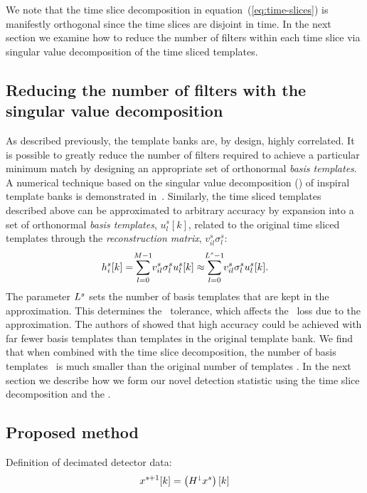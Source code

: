 We note that
the time slice decomposition in equation~(\ref{eq:time-slices}) is manifestly
orthogonal since the time slices are disjoint in time.  In the next
section we examine how to reduce the number of filters within each time slice via
singular value decomposition of the time sliced templates.

\subsection{Reducing the number of filters with the singular value
decomposition}

As described previously, the template banks are, by design, highly correlated.
It is possible to greatly reduce the number of filters required to achieve a
particular minimum match by designing an appropriate set of orthonormal {\em
basis templates}.  A numerical technique based on the
singular value decomposition (\SVD) of inspiral template banks is demonstrated
in~\cite{Cannon:2010p10398}.  Similarly, the time sliced templates described above
can be approximated to arbitrary accuracy by expansion into a set of orthonormal
\emph{basis templates}, $u_l^s[k]$, related to the original time sliced templates
through the \emph{reconstruction matrix}, $v_{il}^s\sigma_l^s$:
%
\begin{equation}
h_i^s[k] = \sum_{\mathclap{l=0}}^{\mathclap{M-1}} v_{il}^s \sigma_l^s u_l^s[k] \approx \sum_{\mathclap{l=0}}^{\mathclap{L^s-1}} v_{il}^s \sigma_l^s u_l^s[k].
\label{eq:svddecomp}
\end{equation}
%
%
%
The parameter $L^s$ sets the number of basis templates that are kept in the
approximation.  This determines the \SVD\ tolerance, which affects the \SNR\ loss due
to the approximation.  The authors of \cite{Cannon:2010p10398} showed that high accuracy
could be achieved with far fewer basis templates than templates in the original template
bank.  We find that when combined with the time slice decomposition, the number of basis 
templates \numsvdtmps\ is much smaller than the original number of templates \numtmps.
In the next section we describe how we form our novel detection statistic using the time slice decomposition and the \SVD.

\subsection{Proposed method}

Definition of decimated detector data:
\begin{equation}
	x^{s+1}[k] = \left( H^\shortdownarrow x^s\right)[k]
\end{equation}

